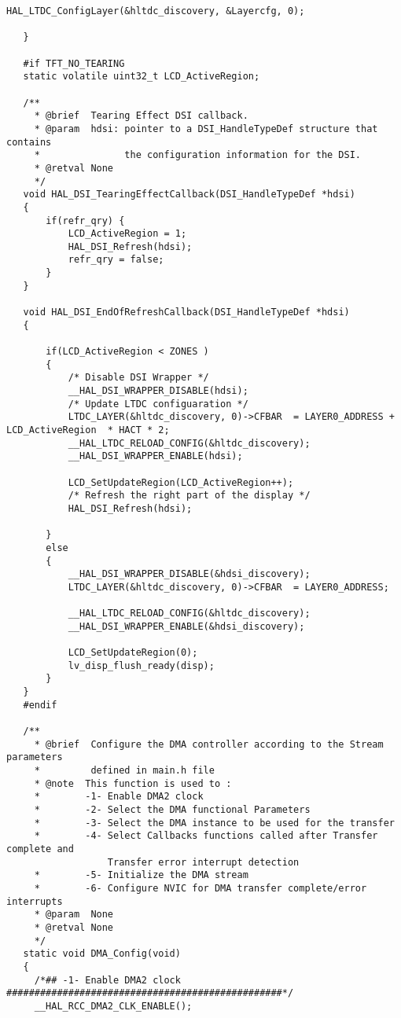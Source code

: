 \begin{lstlisting}[captionpos=t, caption={Fichero \texttt{tft.c}}]
      HAL_LTDC_ConfigLayer(&hltdc_discovery, &Layercfg, 0);
   
   }
   
   #if TFT_NO_TEARING
   static volatile uint32_t LCD_ActiveRegion;
   
   /**
     * @brief  Tearing Effect DSI callback.
     * @param  hdsi: pointer to a DSI_HandleTypeDef structure that contains
     *               the configuration information for the DSI.
     * @retval None
     */
   void HAL_DSI_TearingEffectCallback(DSI_HandleTypeDef *hdsi)
   {
       if(refr_qry) {
           LCD_ActiveRegion = 1;
           HAL_DSI_Refresh(hdsi);
           refr_qry = false;
       }
   }
   
   void HAL_DSI_EndOfRefreshCallback(DSI_HandleTypeDef *hdsi)
   {
   
       if(LCD_ActiveRegion < ZONES )
       {
           /* Disable DSI Wrapper */
           __HAL_DSI_WRAPPER_DISABLE(hdsi);
           /* Update LTDC configuaration */
           LTDC_LAYER(&hltdc_discovery, 0)->CFBAR  = LAYER0_ADDRESS + LCD_ActiveRegion  * HACT * 2;
           __HAL_LTDC_RELOAD_CONFIG(&hltdc_discovery);
           __HAL_DSI_WRAPPER_ENABLE(hdsi);
   
           LCD_SetUpdateRegion(LCD_ActiveRegion++);
           /* Refresh the right part of the display */
           HAL_DSI_Refresh(hdsi);
   
       }
       else
       {
           __HAL_DSI_WRAPPER_DISABLE(&hdsi_discovery);
           LTDC_LAYER(&hltdc_discovery, 0)->CFBAR  = LAYER0_ADDRESS;
   
           __HAL_LTDC_RELOAD_CONFIG(&hltdc_discovery);
           __HAL_DSI_WRAPPER_ENABLE(&hdsi_discovery);
   
           LCD_SetUpdateRegion(0);
           lv_disp_flush_ready(disp);
       }
   }
   #endif
   
   /**
     * @brief  Configure the DMA controller according to the Stream parameters
     *         defined in main.h file
     * @note  This function is used to :
     *        -1- Enable DMA2 clock
     *        -2- Select the DMA functional Parameters
     *        -3- Select the DMA instance to be used for the transfer
     *        -4- Select Callbacks functions called after Transfer complete and
                  Transfer error interrupt detection
     *        -5- Initialize the DMA stream
     *        -6- Configure NVIC for DMA transfer complete/error interrupts
     * @param  None
     * @retval None
     */
   static void DMA_Config(void)
   {
     /*## -1- Enable DMA2 clock #################################################*/
     __HAL_RCC_DMA2_CLK_ENABLE();
   

\end{lstlisting}
